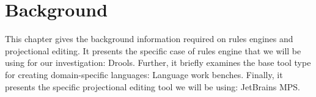 \chapter{Background}\label{chapter:Background}

This chapter gives the background information required on rules engines and projectional editing.
It presents the specific case of rules engine that we will be using for our investigation: Drools.
Further, it briefly examines the base tool type for creating domain-specific languages: Language work benches.
Finally, it presents the specific projectional editing tool we will be using: JetBrains MPS.



